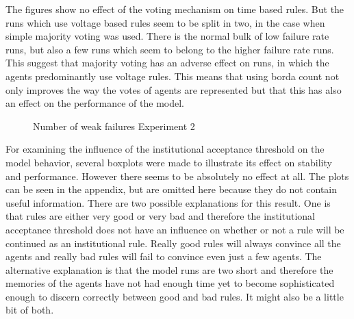 \documentclass[a4paper]{article}
\begin{document}
The figures show no effect of the voting mechanism on time based rules.
But  the runs which use voltage based rules seem to be split in two, in the case when simple majority voting was used. 
There is the normal bulk of low failure rate runs, but also a few runs which seem to belong to the higher failure rate runs. 
This suggest that majority voting has an adverse effect on runs, in which the agents predominantly use voltage rules. 
This means that using borda count not only improves the way the votes of agents are represented but that this has also an 
effect on the performance of the model.
\begin{figure}[!ht]
\caption{Number of weak failures Experiment 2}
\label{b_weak}
\end{figure}

For examining the influence of the institutional acceptance threshold on the model behavior, several boxplots were made to illustrate its 
effect on stability and performance. However there seems to be absolutely no effect at all. The plots can be seen in the appendix, but are
omitted here because they do not contain useful information. There are two possible explanations for this result. One is that 
rules are either very good or very bad and therefore the institutional acceptance threshold does not have an influence on 
whether or not a rule will be continued as an institutional rule. Really good rules will always convince all the agents and really bad 
rules will fail to convince even just a few agents. The alternative explanation is that the model runs are two short and therefore 
the memories of the agents have not had enough time yet to become sophisticated enough to discern correctly between good and bad rules.
It might also be a little bit of both.
\clearpage
\end{document}
